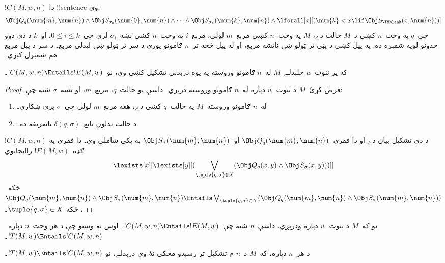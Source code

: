 \documentclass[../../../include/open-logic-section]{subfiles}
\begin{document}
\begin{defn}
$!C(M, w, n)$ دا !!{sentence} وي:
\[
\Obj Q_q(\num{m}, \num{n}) \land \Obj S_{\sigma_0}(\num{0}, \num{n})
\land \dots \land \Obj S_{\sigma_k}(\num{k}, \num{n}) \land
\lforall[x][(\num{k} < x \lif \Obj S_\TMblank(x, \num{n}))]
\]
چې~$q$ په وخت~$n$ کښې د~$M$ حالت دے، $M$ په وخت~$n$ کښې مربع~$m$
لولي، مربع~$i$ په وخت~$n$ کښې نښه~$\sigma_i$ لري چې~$0 \le i \le
k$، او~$k$ د دې دوو حدونو لويه شمېره ده: په پيل کښې د پټې تر ټولو ښۍ ناتشه
مربع، او له پيل څخه تر~$n$ ګامونو پورې د سر تر ټولو ښۍ ليدلې مربع۔ د سر د پيل مربع هم شمېرل کېږي۔
\end{defn}

\begin{lem}
که پر ننوت~$w$ چلېدلے~$M$ له~$n$ ګامونو وروسته په يوه درېدني تشکيل
کښې وي، نو~$!C(M, w, n) \Entails !E(M, w)$۔
\end{lem}

\begin{proof}
فرض کړئ~$M$ د ننوت~$w$ دپاره له~$n$ ګامونو وروسته درېږي۔ داسې يو
حالت~$q$، مربع~$m$، او نښه~$\sigma$ شته چې:
\begin{enumerate}
\item له~$n$ ګامونو وروسته~$M$ په حالت~$q$ کښې دے، هغه مربع~$m$
  لولي چې~$\sigma$ پرې ښکاري۔
\item د حالت بدلون تابع~$\delta(q, \sigma)$ ناتعريفه ده۔
\end{enumerate}
$!C(M, w, n)$ د دې تشکيل بيان دے او دا فقرې~$\Obj Q_{q}(\num{m},
\num{n})$ او~$\Obj S_{\sigma}(\num{m}, \num{n})$ به پکې شاملې وي۔
دا فقرې په ګډه~$!E(M, w)$ راايجابوي:
\[
\lexists[x][\lexists[y][(\bigvee_{\tuple{q, \sigma} \in
      X}(\Obj Q_q(x, y) \land \Obj S_\sigma(x, y)))]]
\]
ځکه~$\Obj Q_{q}(\num{m}, \num{n}) \land \Obj S_{\sigma}(\num{m},
\num{n}) \Entails \bigvee_{\tuple{q, \sigma} \in X} (\Obj Q_q(\num{m},
\num{n}) \land \Obj S_{\sigma}(\num{m}, \num{n}))$، ځکه
$\tuple{q,\sigma} \in X$۔
\end{proof}

\begin{explain}
نو که~$M$ د ننوت~$w$ دپاره ودرېږي، داسې~$n$ شته چې~$!C(M, w, n)
\Entails !E(M,w)$۔ اوس به وښيو چې د هر وخت~$n$ دپاره~$!T(M, w)
\Entails !C(M, w, n)$۔
\end{explain}

\begin{lem}
د هر~$n$ دپاره، که~$M$ د~$n$-م تشکيل تر رسېدو مخکې نۀ وي درېدلے، نو
$!T(M, w) \Entails !C(M, w, n)$۔
\end{lem}
\end{document}

